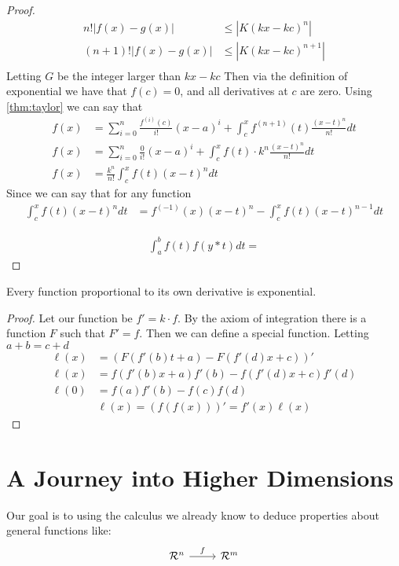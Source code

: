 \begin{proof}
  \begin{align*}
    n!|f(x)-g(x)| &\leq \left|K (kx-kc)^{n}\right|\\
    (n+1)!|f(x)-g(x)| &\leq \left|K (kx-kc)^{n+1}\right|\\
  \end{align*}
  Letting $G$ be the integer larger than $kx-kc$ Then via the definition of exponential we have that $f(c)=0$, and all derivatives at $c$ are zero. Using \autoref{thm:taylor} we can say that
  \begin{align*}
    f(x)&=\sum_{i=0}^n \frac{f^{(i)}(c)}{i!}(x-a)^i + \int_c^x f^{(n+1)}(t)\frac{(x-t)^{n}}{n!}dt\\
    f(x)&=\sum_{i=0}^n \frac{0}{i!}(x-a)^i + \int_c^x f(t)\cdot k^n \frac{(x-t)^{n}}{n!}dt\\
    f(x)&=\frac{k^n}{n!}\int_c^x f(t)(x-t)^{n}dt
  \end{align*}
  Since we can say that for any function
  \begin{align*}
    \int_c^x f(t)(x-t)^{n}dt&=f^{(-1)}(x)(x-t)^n-\int_c^x f(t)(x-t)^{n-1}dt
  \end{align*}

  \begin{align*}
    \int_a^b f(t)f(y*t)dt=
  \end{align*}
\end{proof}

\begin{theorem}
  Every function proportional to its own derivative is exponential.
\end{theorem}
\begin{proof}
  Let our function be $f'=k \cdot f$. By the axiom of integration there is a function $F$ such that $F'=f$. Then we can define a special function. Letting $a+b=c+d$
  \begin{align*}
    \ell(x)&= \left(F(f'(b)t+a)-F(f'(d)x+c)\right)'\\
    \ell(x)&=f(f'(b)x+a)f'(b)-f(f'(d)x+c)f'(d)\\
    \ell(0)&=f(a)f'(b)-f(c)f(d)
  \end{align*}
  \begin{align*}
    \ell(x)=(f(f(x)))'
    =f'(x)\ell(x)
  \end{align*}
\end{proof}
\chapter{A Journey into Higher Dimensions}
Our goal is to using the calculus we already know to deduce properties about general functions like:
\[\begin{tikzcd}
	{\mathcal{R}^n} & {\mathcal{R}^m}
	\arrow["f", from=1-1, to=1-2]
\end{tikzcd}\]
 
